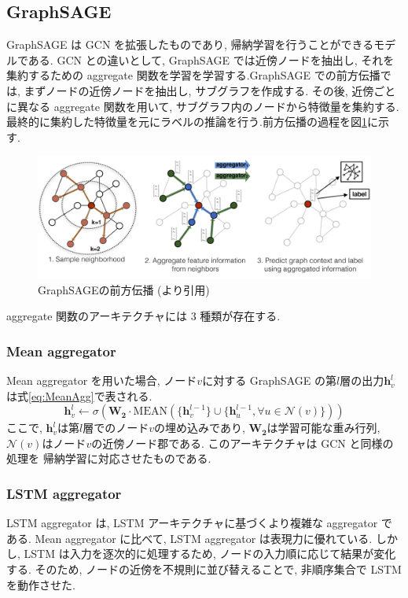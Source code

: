 \documentclass[a4j,twoside,12pt,dvipdfmx]{thesis} %
\begin{document}
\subsection{GraphSAGE}
GraphSAGE は GCN を拡張したものであり, 帰納学習を行うことができるモデルである. GCN との違いとして, GraphSAGE では近傍ノードを抽出し, それを集約するための aggregate 関数を学習を学習する.GraphSAGE での前方伝播では, まずノードの近傍ノードを抽出し, サブグラフを作成する.
その後, 近傍ごとに異なる aggregate 関数を用いて, サブグラフ内のノードから特徴量を集約する.
最終的に集約した特徴量を元にラベルの推論を行う.前方伝播の過程を図\ref{fig:SAGE}に示す.

\begin{figure}
  \centering
  \includegraphics[width=\linewidth]
  {img/GraphSAGE.png}
  \caption{GraphSAGEの前方伝播 (\cite{hamilton2017inductive}より引用)}
  \label{fig:SAGE}
\end{figure}

aggregate 関数のアーキテクチャには 3 種類が存在する.
\subsubsection{Mean aggregator}
Mean aggregator を用いた場合, ノード$v$に対する GraphSAGE の第$l$層の出力$\mathbf{h}_{v}^{l}$は式\ref{eq:MeanAgg}で表される.
\begin{equation}
  \label{eq:MeanAgg}
  \mathbf{h}_{v}^{l} \leftarrow \sigma(\mathbf{W_{2}} \cdot \mathrm{MEAN} (\{ \mathbf{h}_{v}^{l-1}\} \cup \{ \mathbf{h}_{u}^{l-1} , \forall u \in \mathcal{N}(v) \}))
\end{equation}
ここで, $\mathbf{h}_{v}^{l}$は第$l$層でのノード$v$の埋め込みであり, $\mathbf{W_{2}}$は学習可能な重み行列, $\mathcal{N}(v)$はノード$v$の近傍ノード郡である.
このアーキテクチャは GCN と同様の処理を 帰納学習に対応させたものである.

\subsubsection{LSTM aggregator}
LSTM aggregator は, LSTM アーキテクチャに基づくより複雑な aggregator である. Mean aggregator に比べて, LSTM aggregator は表現力に優れている. しかし, LSTM は入力を逐次的に処理するため, ノードの入力順に応じて結果が変化する. そのため, ノードの近傍を不規則に並び替えることで, 非順序集合で LSTM を動作させた.
\end{document}
